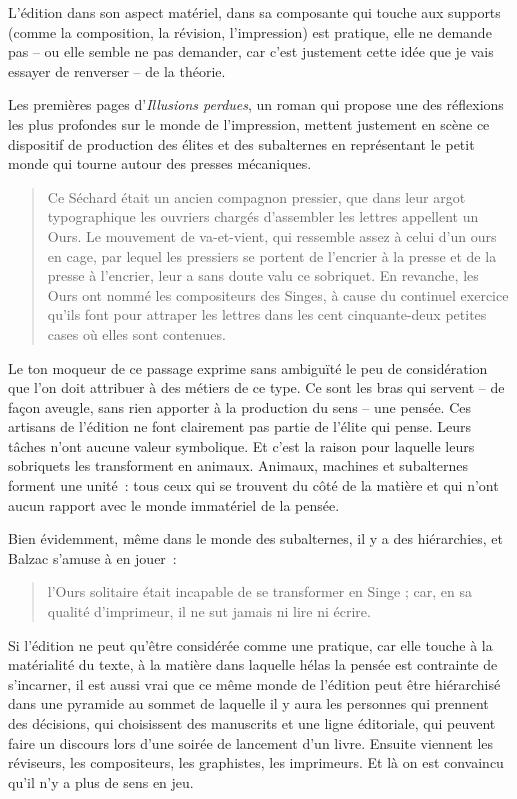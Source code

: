L'édition dans son aspect matériel, dans sa composante qui touche aux
supports (comme la composition, la révision, l'impression) est pratique,
elle ne demande pas -- ou elle semble ne pas demander, car c'est
justement cette idée que je vais essayer de renverser -- de la théorie.

Les premières pages d'\emph{Illusions perdues}, un roman qui propose une
des réflexions les plus profondes sur le monde de l'impression, mettent
justement en scène ce dispositif de production des élites et des
subalternes en représentant le petit monde qui tourne autour des presses
mécaniques.

\begin{quote}
Ce Séchard était un ancien compagnon pressier, que dans leur argot
typographique les ouvriers chargés d'assembler les lettres appellent un
Ours. Le mouvement de va-et-vient, qui ressemble assez à celui d'un ours
en cage, par lequel les pressiers se portent de l'encrier à la presse et
de la presse à l'encrier, leur a sans doute valu ce sobriquet. En
revanche, les Ours ont nommé les compositeurs des Singes, à cause du
continuel exercice qu'ils font pour attraper les lettres dans les cent
cinquante-deux petites cases où elles sont contenues.
\end{quote}

Le ton moqueur de ce passage exprime sans ambiguïté le peu de
considération que l'on doit attribuer à des métiers de ce type. Ce sont
les bras qui servent -- de façon aveugle, sans rien apporter à la
production du sens -- une pensée. Ces artisans de l'édition ne font
clairement pas partie de l'élite qui pense. Leurs tâches n'ont aucune
valeur symbolique. Et c'est la raison pour laquelle leurs sobriquets les
transforment en animaux. Animaux, machines et subalternes forment une
unité~: tous ceux qui se trouvent du côté de la matière et qui n'ont
aucun rapport avec le monde immatériel de la pensée.

Bien évidemment, même dans le monde des subalternes, il y a des
hiérarchies, et Balzac s'amuse à en jouer~:

\begin{quote}
l'Ours solitaire était incapable de se transformer en Singe ; car, en sa
qualité d'imprimeur, il ne sut jamais ni lire ni écrire.
\end{quote}

Si l'édition ne peut qu'être considérée comme une pratique, car elle
touche à la matérialité du texte, à la matière dans laquelle hélas la
pensée est contrainte de s'incarner, il est aussi vrai que ce même monde
de l'édition peut être hiérarchisé dans une pyramide au sommet de
laquelle il y aura les personnes qui prennent des décisions, qui
choisissent des manuscrits et une ligne éditoriale, qui peuvent faire un
discours lors d'une soirée de lancement d'un livre. Ensuite viennent les
réviseurs, les compositeurs, les graphistes, les imprimeurs. Et là on
est convaincu qu'il n'y a plus de sens en jeu.

